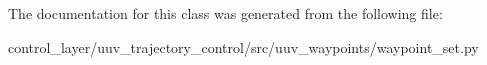 The documentation for this class was generated from the following file\+:\begin{DoxyCompactItemize}
\item 
control\+\_\+layer/uuv\+\_\+trajectory\+\_\+control/src/uuv\+\_\+waypoints/waypoint\+\_\+set.\+py\end{DoxyCompactItemize}
